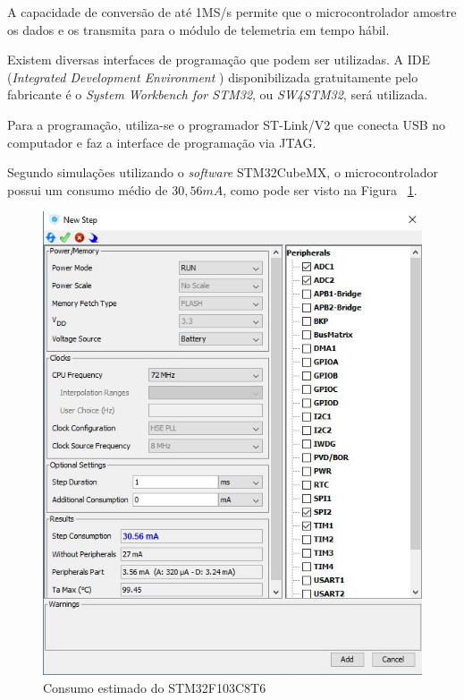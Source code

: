 \documentclass[
	12pt,				%
	openright,			%
	twoside,			%
	a4paper,			%
	english,			%
	french,				%
	spanish,			%
	brazil,				%
	]{abntex2}
\begin{document}
		A capacidade de conversão de até 1MS/s permite que o
		microcontrolador amostre os dados e os transmita para o módulo
		de telemetria em tempo hábil.

		Existem diversas interfaces de programação que podem ser
		utilizadas. A IDE (\textit{Integrated Development Environment })
		disponibilizada gratuitamente pelo fabricante é o \textit{System
		Workbench for STM32}, ou \textit{SW4STM32}, será utilizada.

		Para a programação, utiliza-se o programador ST-Link/V2 que
		conecta USB no computador e faz a interface de programação via
		JTAG.

		Segundo simulações utilizando o \textit{software} STM32CubeMX, o
		microcontrolador possui um consumo médio de $30,56mA$, como pode ser
		visto na Figura ~\ref{fig:consumoSTM}.

		\begin{figure}[!ht]
			\centering
			\includegraphics[scale = 0.6]{../Fotos/stmConsumo.jpg}
			\caption{Consumo estimado do STM32F103C8T6}
			\label{fig:consumoSTM}
		\end{figure}
\end{document}
